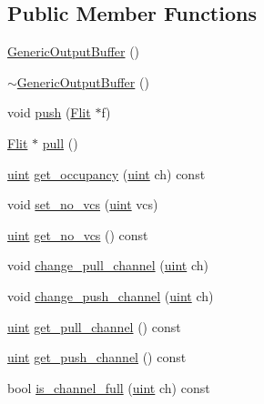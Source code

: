 \subsection*{Public Member Functions}
\begin{CompactItemize}
\item 
\hyperlink{classGenericOutputBuffer_10c4287e27f634982bc28e1de2b31757}{GenericOutputBuffer} ()
\item 
\hyperlink{classGenericOutputBuffer_d67316556a00a71d7b98818de74328ff}{$\sim$GenericOutputBuffer} ()
\item 
void \hyperlink{classGenericOutputBuffer_f2b4047e054df5bb9b624ce0b0bbf0e2}{push} (\hyperlink{classFlit}{Flit} $\ast$f)
\item 
\hyperlink{classFlit}{Flit} $\ast$ \hyperlink{classGenericOutputBuffer_3c3f1b425635f59b0539805945ddb1bd}{pull} ()
\item 
\hyperlink{outputBuffer_8h_91ad9478d81a7aaf2593e8d9c3d06a14}{uint} \hyperlink{classGenericOutputBuffer_0b8b70b9b3ab71195eea8d0d810dce94}{get\_\-occupancy} (\hyperlink{outputBuffer_8h_91ad9478d81a7aaf2593e8d9c3d06a14}{uint} ch) const 
\item 
void \hyperlink{classGenericOutputBuffer_a0dcb541c9d64d097a21dd8b290c3950}{set\_\-no\_\-vcs} (\hyperlink{outputBuffer_8h_91ad9478d81a7aaf2593e8d9c3d06a14}{uint} vcs)
\item 
\hyperlink{outputBuffer_8h_91ad9478d81a7aaf2593e8d9c3d06a14}{uint} \hyperlink{classGenericOutputBuffer_6f5495e1ddd1b524d105d86b083e85cc}{get\_\-no\_\-vcs} () const 
\item 
void \hyperlink{classGenericOutputBuffer_c4f3cf09d07b340af349820bcaed731e}{change\_\-pull\_\-channel} (\hyperlink{outputBuffer_8h_91ad9478d81a7aaf2593e8d9c3d06a14}{uint} ch)
\item 
void \hyperlink{classGenericOutputBuffer_d7576df13afbc101eb997e35ad417739}{change\_\-push\_\-channel} (\hyperlink{outputBuffer_8h_91ad9478d81a7aaf2593e8d9c3d06a14}{uint} ch)
\item 
\hyperlink{outputBuffer_8h_91ad9478d81a7aaf2593e8d9c3d06a14}{uint} \hyperlink{classGenericOutputBuffer_c3e3831a4eb7b09b053b511722e89daf}{get\_\-pull\_\-channel} () const 
\item 
\hyperlink{outputBuffer_8h_91ad9478d81a7aaf2593e8d9c3d06a14}{uint} \hyperlink{classGenericOutputBuffer_d7f10031a96719bc97a11d3a96f4ef6f}{get\_\-push\_\-channel} () const 
\item 
bool \hyperlink{classGenericOutputBuffer_cc3ce27817dea583b8c0cb269b3c9cdb}{is\_\-channel\_\-full} (\hyperlink{outputBuffer_8h_91ad9478d81a7aaf2593e8d9c3d06a14}{uint} ch) const 

\end{CompactItemize}
